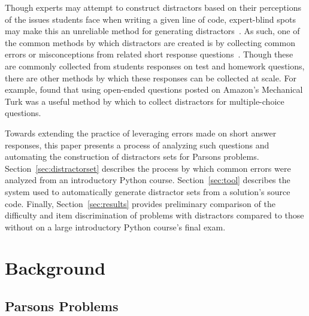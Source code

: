 \documentclass[]{acmart}
\begin{document}
Though experts may attempt to construct distractors based on their perceptions
of the issues students face when writing a given line of code, expert-blind
spots may make this an unreliable method for generating
distractors~\cite{nathan2001expert}. As such, one of the common methods by
which distractors are created is by collecting common errors or misconceptions
from related short response questions~\cite{briggs2006diagnostic,
halloun1985initial}. Though these are commonly collected from students
responses on test and homework questions, there are other methods by which
these responses can be collected at scale.  For example,
\citet{scheponik2019investigating} found that using open-ended questions posted
on Amazon's Mechanical Turk was a useful method by which to collect distractors
for multiple-choice questions. 

Towards extending the practice of leveraging errors made on short answer
responses, this paper presents a process of analyzing such questions and
automating the construction of distractors sets for Parsons problems.
Section~\ref{sec:distractorset} describes the process by which common errors
were analyzed from an introductory Python course. Section~\ref{sec:tool}
describes the system used to automatically generate distractor sets from a
solution's source code.  Finally, Section~\ref{sec:results} provides
preliminary comparison of the difficulty and item discrimination of problems
with distractors compared to those without on a large introductory Python
course's final exam.


\section{Background}

\subsection{Parsons Problems}
\end{document}
